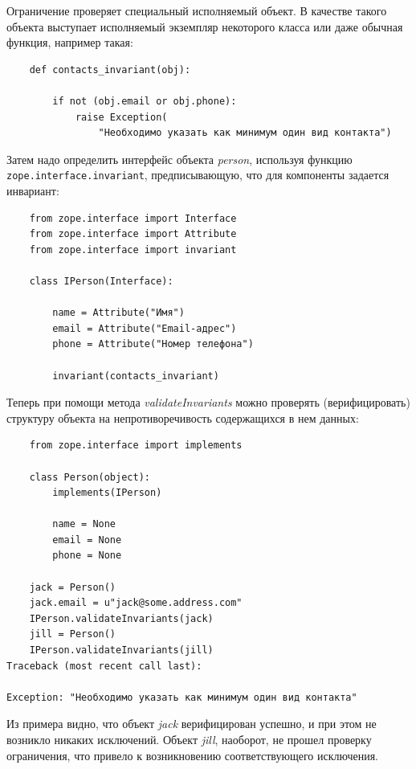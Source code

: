 \documentclass[a4paper,openany,twoside,final]{book}
\providecommand*{\DUroletitlereference}[1]{\textsl{#1}}
\begin{document}
Ограничение проверяет специальный исполняемый объект.  В качестве такого объекта выступает исполняемый экземпляр некоторого класса или даже обычная функция, например такая:

\begin{verbatim}
    def contacts_invariant(obj):

        if not (obj.email or obj.phone):
            raise Exception(
                "Необходимо указать как минимум один вид контакта")
\end{verbatim}

Затем надо определить интерфейс объекта \DUroletitlereference{person}, используя функцию \texttt{zope.interface.invariant}, предписывающую, что для компоненты задается инвариант:

\begin{verbatim}
    from zope.interface import Interface
    from zope.interface import Attribute
    from zope.interface import invariant

    class IPerson(Interface):

        name = Attribute("Имя")
        email = Attribute("Email-адрес")
        phone = Attribute("Номер телефона")

        invariant(contacts_invariant)
\end{verbatim}

Теперь при помощи метода \DUroletitlereference{validateInvariants} можно проверять (верифицировать) структуру объекта на непротиворечивость содержащихся в нем данных:

\begin{verbatim}
    from zope.interface import implements

    class Person(object):
        implements(IPerson)

        name = None
        email = None
        phone = None

    jack = Person()
    jack.email = u"jack@some.address.com"
    IPerson.validateInvariants(jack)
    jill = Person()
    IPerson.validateInvariants(jill)
Traceback (most recent call last):

Exception: "Необходимо указать как минимум один вид контакта"
\end{verbatim}

Из примера видно, что объект \DUroletitlereference{jack} верифицирован успешно, и при этом не возникло никаких исключений.  Объект \DUroletitlereference{jill}, наоборот, не прошел проверку ограничения, что привело к возникновению соответствующего исключения.
\end{document}
